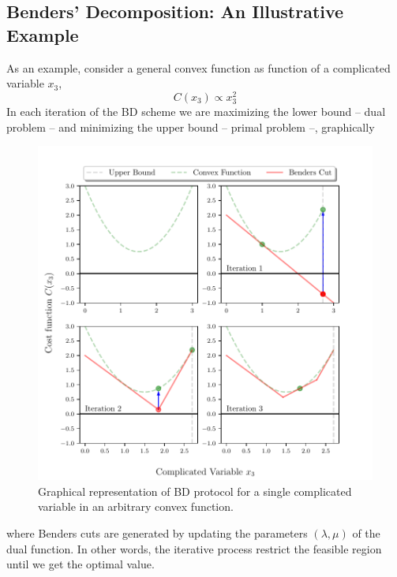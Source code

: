 \subsection{Benders' Decomposition: An Illustrative Example}
As an example, consider a general convex function as function of a complicated variable $x_{3}$,
\begin{equation}
    C(x_{3}) \propto x_{3}^{2}
\end{equation}
In each iteration of the BD scheme we are maximizing the lower bound -- dual problem -- and minimizing the upper bound -- primal problem --, graphically
\begin{figure}[H]
\centering
\includegraphics[width=\textwidth]{Figures/BenderIlustration.pdf} 
\caption{Graphical representation of BD protocol for a single complicated variable in an arbitrary convex function.}
\label{fig:BDIlustration}
\end{figure}
where Benders cuts are generated by updating the parameters $(\lambda,\mu)$ of the dual function. In other words, the iterative process restrict the feasible region until we get the optimal value.
